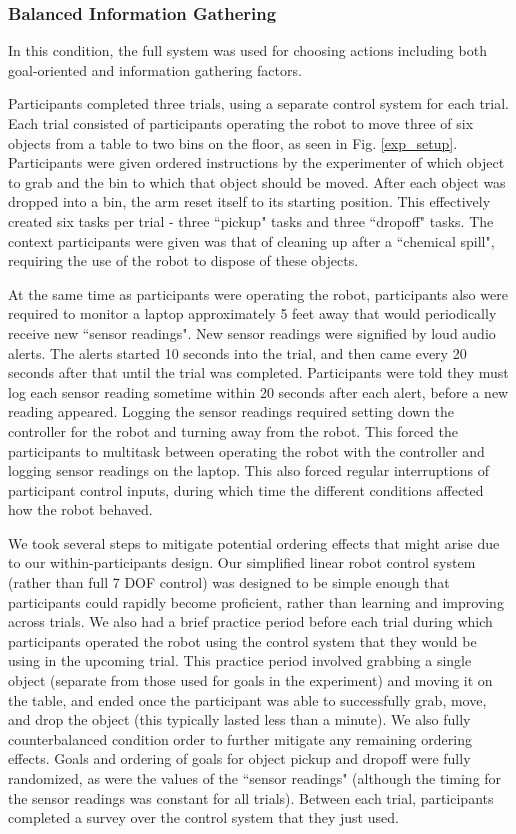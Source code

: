\documentclass[conference]{IEEEtran}
\begin{document}
\subsubsection{Balanced Information Gathering}
In this condition, the full system was used for choosing actions including both goal-oriented and information gathering factors.

Participants completed three trials, using a separate control system for each trial. Each trial consisted of participants operating the robot to move three of six objects from a table to two bins on the floor, as seen in Fig. \ref{exp_setup}. Participants were given ordered instructions by the experimenter of which object to grab and the bin to which that object should be moved. After each object was dropped into a bin, the arm reset itself to its starting position. This effectively created six tasks per trial - three ``pickup" tasks and three ``dropoff" tasks. The context participants were given was that of cleaning up after a ``chemical spill", requiring the use of the robot to dispose of these objects.

At the same time as participants were operating the robot, participants also were required to monitor a laptop approximately 5 feet away that would periodically receive new ``sensor readings". New sensor readings were signified by loud audio alerts. The alerts started 10 seconds into the trial, and then came every 20 seconds after that until the trial was completed. Participants were told they must log each sensor reading sometime within 20 seconds after each alert, before a new reading appeared. Logging the sensor readings required setting down the controller for the robot and turning away from the robot. This forced the participants to multitask between operating the robot with the controller and logging sensor readings on the laptop. This also forced regular interruptions of participant control inputs, during which time the different conditions affected how the robot behaved.

We took several steps to mitigate potential ordering effects that might arise due to our within-participants design. Our simplified linear robot control system (rather than full 7 DOF control) was designed to be simple enough that participants could rapidly become proficient, rather than learning and improving across trials. We also had a brief practice period before each trial during which participants operated the robot using the control system that they would be using in the upcoming trial. This practice period involved grabbing a single object (separate from those used for goals in the experiment) and moving it on the table, and ended once the participant was able to successfully grab, move, and drop the object (this typically lasted less than a minute). We also fully counterbalanced condition order to further mitigate any remaining ordering effects. Goals and ordering of goals for object pickup and dropoff were fully randomized, as were the values of the ``sensor readings" (although the timing for the sensor readings was constant for all trials). Between each trial, participants completed a survey over the control system that they just used.
\end{document}
